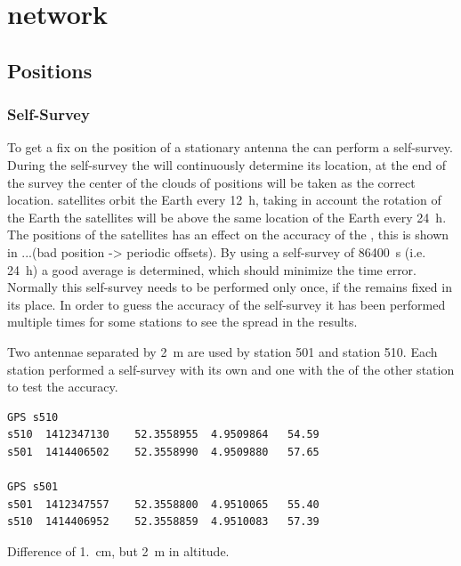 \chapter{\hisparc network}
\label{ch:cluster}




\section{Positions}

\subsection{\gps Self-Survey}

To get a fix on the position of a stationary \gps antenna the \gps can perform a self-survey. During the self-survey the \gps will continuously determine its location, at the end of the survey the center of the clouds of positions will be taken as the correct location. \gps satellites orbit the Earth every \SI{12}{\hour}, taking in account the rotation of the Earth the \gps satellites will be above the same location of the Earth every \SI{24}{\hour}. The positions of the \gps satellites has an effect on the accuracy of the \gps, this is shown in ...(bad position -> periodic offsets). By using a self-survey of \SI{86400}{\second} (i.e. \SI{24}{\hour}) a good average is determined, which should minimize the time error. Normally this self-survey needs to be performed only once, if the \gps remains fixed in its place. In order to guess the accuracy of the self-survey it has been performed multiple times for some stations to see the spread in the results.

Two \gps antennae separated by \SI{2}{\meter} are used by station 501 and station 510. Each station performed a self-survey with its own \gps and one with the \gps of the other station to test the accuracy.

\begin{verbatim}
GPS s510
s510  1412347130	52.3558955	4.9509864	54.59
s501  1414406502	52.3558990	4.9509880	57.65

GPS s501
s501  1412347557	52.3558800	4.9510065	55.40
s510  1414406952	52.3558859	4.9510083	57.39
\end{verbatim}

Difference of \SI{1.}{\centi\meter}, but \SI{2}{\meter} in altitude.


